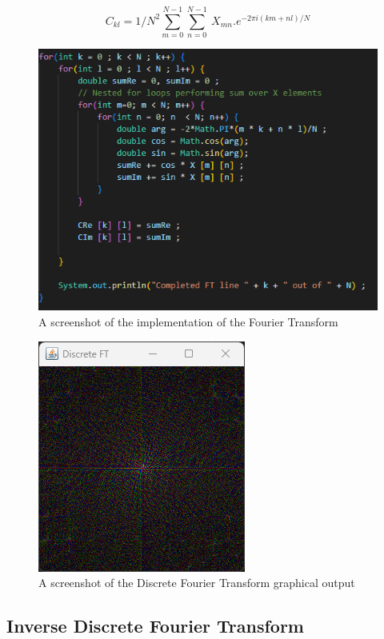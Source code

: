    \begin{center}
        \begin{equation}
            C_{kl} = 1/N^2 \sum_{m=0}^{N-1} \sum_{n=0}^{N-1}\ X_{mn} . e^{-2\pi i(km+nl)/N}
            \label{fig:equation-FT}
        \end{equation}  
    \end{center}




    
    \begin{figure}[H]
        \centering
        \includegraphics[width=0.49\columnwidth]{Figures/Week 1/W1-SimpleFT-Completed-For-Loop.png}
        \caption{A screenshot of the implementation of the Fourier Transform}
        \label{fig:wolf-FT-code}
    \end{figure}
    
    \begin{figure}[H]
        \centering
        \includegraphics[width=0.49\columnwidth]{Figures/Week 1/W1-FT.png}
        \caption{A screenshot of the Discrete Fourier Transform graphical output}
        \label{fig:wolf-DFT}
    \end{figure}
    
    
    \subsection{Inverse Discrete Fourier Transform}


